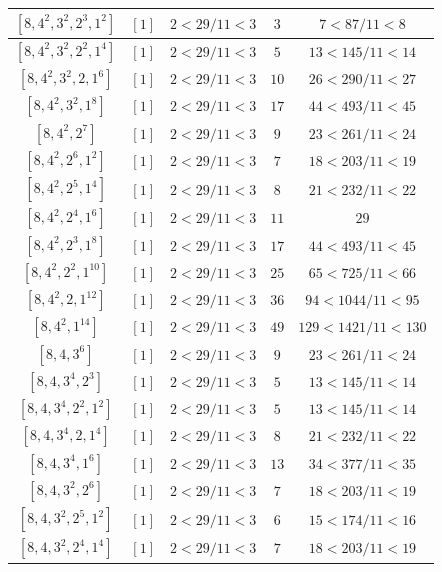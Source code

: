 \documentclass{article}%
\begin{document}
\begin{center}
\begin{longtable}{||c|c|c|c|c||}
$[8, 4^{2}, 3^{2}, 2^{3}, 1^{2}]$ & $[1]$ & $2 < 29/11 < 3$ & $3$ & $7 < 87/11 < 8$ \\ \hline 
$[8, 4^{2}, 3^{2}, 2^{2}, 1^{4}]$ & $[1]$ & $2 < 29/11 < 3$ & $5$ & $13 < 145/11 < 14$ \\ \hline 
$[8, 4^{2}, 3^{2}, 2, 1^{6}]$ & $[1]$ & $2 < 29/11 < 3$ & $10$ & $26 < 290/11 < 27$ \\ \hline 
$[8, 4^{2}, 3^{2}, 1^{8}]$ & $[1]$ & $2 < 29/11 < 3$ & $17$ & $44 < 493/11 < 45$ \\ \hline 
$[8, 4^{2}, 2^{7}]$ & $[1]$ & $2 < 29/11 < 3$ & $9$ & $23 < 261/11 < 24$ \\ \hline 
$[8, 4^{2}, 2^{6}, 1^{2}]$ & $[1]$ & $2 < 29/11 < 3$ & $7$ & $18 < 203/11 < 19$ \\ \hline 
$[8, 4^{2}, 2^{5}, 1^{4}]$ & $[1]$ & $2 < 29/11 < 3$ & $8$ & $21 < 232/11 < 22$ \\ \hline 
$[8, 4^{2}, 2^{4}, 1^{6}]$ & $[1]$ & $2 < 29/11 < 3$ & $11$ & $29$ \\ \hline 
$[8, 4^{2}, 2^{3}, 1^{8}]$ & $[1]$ & $2 < 29/11 < 3$ & $17$ & $44 < 493/11 < 45$ \\ \hline 
$[8, 4^{2}, 2^{2}, 1^{10}]$ & $[1]$ & $2 < 29/11 < 3$ & $25$ & $65 < 725/11 < 66$ \\ \hline 
$[8, 4^{2}, 2, 1^{12}]$ & $[1]$ & $2 < 29/11 < 3$ & $36$ & $94 < 1044/11 < 95$ \\ \hline 
$[8, 4^{2}, 1^{14}]$ & $[1]$ & $2 < 29/11 < 3$ & $49$ & $129 < 1421/11 < 130$ \\ \hline 
$[8, 4, 3^{6}]$ & $[1]$ & $2 < 29/11 < 3$ & $9$ & $23 < 261/11 < 24$ \\ \hline 
$[8, 4, 3^{4}, 2^{3}]$ & $[1]$ & $2 < 29/11 < 3$ & $5$ & $13 < 145/11 < 14$ \\ \hline 
$[8, 4, 3^{4}, 2^{2}, 1^{2}]$ & $[1]$ & $2 < 29/11 < 3$ & $5$ & $13 < 145/11 < 14$ \\ \hline 
$[8, 4, 3^{4}, 2, 1^{4}]$ & $[1]$ & $2 < 29/11 < 3$ & $8$ & $21 < 232/11 < 22$ \\ \hline 
$[8, 4, 3^{4}, 1^{6}]$ & $[1]$ & $2 < 29/11 < 3$ & $13$ & $34 < 377/11 < 35$ \\ \hline 
$[8, 4, 3^{2}, 2^{6}]$ & $[1]$ & $2 < 29/11 < 3$ & $7$ & $18 < 203/11 < 19$ \\ \hline 
$[8, 4, 3^{2}, 2^{5}, 1^{2}]$ & $[1]$ & $2 < 29/11 < 3$ & $6$ & $15 < 174/11 < 16$ \\ \hline 
$[8, 4, 3^{2}, 2^{4}, 1^{4}]$ & $[1]$ & $2 < 29/11 < 3$ & $7$ & $18 < 203/11 < 19$ \\ \hline 

\end{longtable}
\end{center}
\end{document}
